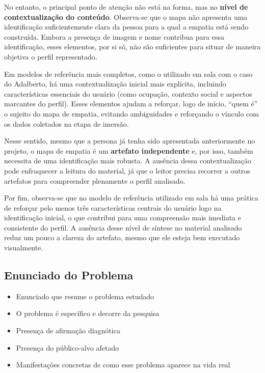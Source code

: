 \documentclass[
  sigconf,
  nonacm, %
  language=portuguese
]{acmart}
\newcommand{\statusok}[1]{{\small\bfseries\color{cgood}#1}}
\begin{document}
No entanto, o principal ponto de atenção não está na forma, mas no \textbf{nível de contextualização do conteúdo}. Observa-se que o mapa não apresenta uma identificação suficientemente clara da pessoa para a qual a empatia está sendo construída. Embora a presença de imagem e nome contribua para essa identificação, esses elementos, por si só, não são suficientes para situar de maneira objetiva o perfil representado.

Em modelos de referência mais completos, como o utilizado em sala com o caso do Adalberto, há uma contextualização inicial mais explícita, incluindo características essenciais do usuário (como ocupação, contexto social e aspectos marcantes do perfil). Esses elementos ajudam a reforçar, logo de início, “quem é” o sujeito do mapa de empatia, evitando ambiguidades e reforçando o vínculo com os dados coletados na etapa de imersão.

Nesse sentido, mesmo que a persona já tenha sido apresentada anteriormente no projeto, o mapa de empatia é um \textbf{artefato independente} e, por isso, também necessita de uma identificação mais robusta. A ausência dessa contextualização pode enfraquecer a leitura do material, já que o leitor precisa recorrer a outros artefatos para compreender plenamente o perfil analisado.

Por fim, observa-se que no modelo de referência utilizado em sala há uma prática de reforçar pelo menos três características centrais do usuário logo na identificação inicial, o que contribui para uma compreensão mais imediata e consistente do perfil. A ausência desse nível de síntese no material analisado reduz um pouco a clareza do artefato, mesmo que ele esteja bem executado visualmente.

\subsection{Enunciado do Problema}

\noindent\statusok{1,00\,/\,1,00 pts · Completo}

\begin{itemize}[leftmargin=14pt,itemsep=1pt,topsep=3pt,parsep=0pt]
  \item[\textcolor{cgood}{$\checkmark$}] {\small\textcolor{cgood}{Enunciado que resume o problema estudado}}
  \item[\textcolor{cgood}{$\checkmark$}] {\small\textcolor{cgood}{O problema é específico e decorre da pesquisa}}
  \item[\textcolor{cgood}{$\checkmark$}] {\small\textcolor{cgood}{Presença de afirmação diagnótica}}
  \item[\textcolor{cgood}{$\checkmark$}] {\small\textcolor{cgood}{Presença do público-alvo afetado}}
  \item[\textcolor{cgood}{$\checkmark$}] {\small\textcolor{cgood}{Manifestações concretas de como esse problema aparece na vida real}}
\end{itemize}
\end{document}
